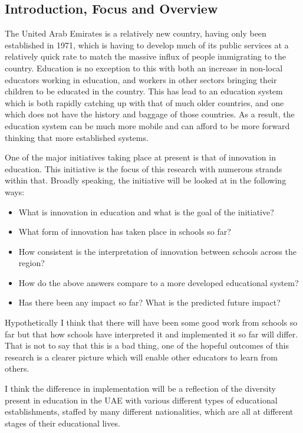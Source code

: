 \subsection{Introduction, Focus and Overview}

The United Arab Emirates is a relatively new country, having only been established in 1971, which is having to develop much of its public services at a relatively quick rate to match the massive influx of people immigrating to the country. Education is no exception to this with both an increase in non-local educators working in education, and workers in other sectors bringing their children to be educated in the country. This has lead to an education system which is both rapidly catching up with that of much older countries, and one which does not have the history and baggage of those countries. As a result, the education system can be much more mobile and can afford to be more forward thinking that more established systems. 

One of the major initiatives taking place at present is that of innovation in education. This initiative is the focus of this research with numerous strands within that. Broadly speaking, the initiative will be looked at in the following ways: 

\begin{itemize}
\item What is innovation in education and what is the goal of the initiative?
\item What form of innovation has taken place in schools so far?
\item How consistent is the interpretation of innovation between schools across the region?
\item How do the above answers compare to a more developed educational system?
\item Has there been any impact so far? What is the predicted future impact?

\end{itemize}

Hypothetically I think that there will have been some good work from schools so far but that how schools have interpreted it and implemented it so far will differ. That is not to say that this is a bad thing, one of the hopeful outcomes of this research is a clearer picture which will enable other educators to learn from others.

I think the difference in implementation will be a reflection of the diversity present in education in the UAE with various different types of educational establishments, staffed by many different nationalities, which are all at different stages of their educational lives.

